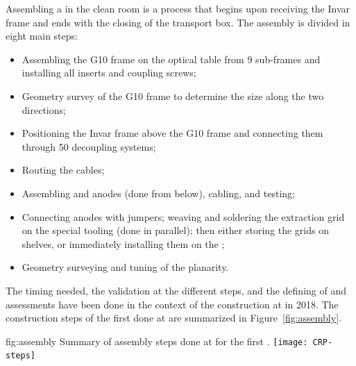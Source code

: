 Assembling a  in the clean room is a process that begins upon receiving the Invar frame and ends with the  closing of the transport box. 
The  assembly is divided in eight main steps:
\begin{itemize}
    \item  Assembling the G10 frame on the optical table from \num{9} sub-frames  and installing all inserts and coupling screws;
\item Geometry survey of the G10 frame to determine the size along the two directions;
\item Positioning the Invar frame  
above the G10 frame and connecting them through \num{50} decoupling systems;
\item Routing the   cables;
\item Assembling  and anodes (done from below), cabling, and  testing;
\item Connecting anodes with jumpers;
 weaving and soldering the extraction grid on the special tooling (done in parallel); then either storing the grids on shelves, or immediately installing them on the ;
\item Geometry surveying and tuning of the planarity.
\end{itemize}

The timing needed, the validation at the different steps, and the defining of  and assessments have been done in the context of the   construction at  in \num{2018}. The construction  steps of the first  done at  are summarized in Figure~\ref{fig:assembly}.

\begin{dunefigure}
{fig:assembly}
{Summary of  assembly steps done at  for the first  .}
\texttt{[image: CRP-steps]}
\end{dunefigure}

